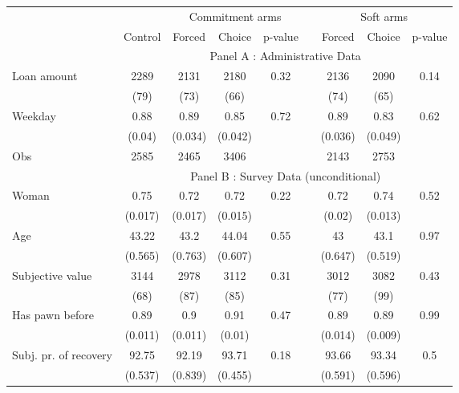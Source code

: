 \begin{tabular}{lcccccccc}
\toprule
      &       & \multicolumn{3}{c}{Commitment arms} &       & \multicolumn{3}{c}{Soft arms} \\
\cmidrule{3-5}\cmidrule{7-9}      & \multicolumn{1}{p{4.545em}}{Control} & \multicolumn{1}{p{4.955em}}{Forced} & \multicolumn{1}{p{3.455em}}{Choice} & \multicolumn{1}{p{3.455em}}{p-value} &       & \multicolumn{1}{p{4.045em}}{Forced} & \multicolumn{1}{p{4.045em}}{Choice } & \multicolumn{1}{p{4.545em}}{p-value} \\
\midrule
      & \multicolumn{8}{c}{Panel A : Administrative Data} \\
\midrule
\midrule
Loan amount  & 2289  & 2131  & 2180  & 0.32  &       & 2136  & 2090  & 0.14 \\
      & (79)  & (73)  & (66)  &       &       & (74)  & (65)  &  \\
Weekday & 0.88  & 0.89  & 0.85  & 0.72  &       & 0.89  & 0.83  & 0.62 \\
      & (0.04) & (0.034) & (0.042) &       &       & (0.036) & (0.049) &  \\
\midrule
Obs   & 2585  & 2465  & 3406  &       &       & 2143  & 2753  &  \\
\midrule
      & \multicolumn{8}{c}{Panel B : Survey Data (unconditional)} \\
\midrule
\midrule
Woman & 0.75  & 0.72  & 0.72  & 0.22  &       & 0.72  & 0.74  & 0.52 \\
      & (0.017) & (0.017) & (0.015) &       &       & (0.02) & (0.013) &  \\
Age   & 43.22 & 43.2  & 44.04 & 0.55  &       & 43    & 43.1  & 0.97 \\
      & (0.565) & (0.763) & (0.607) &       &       & (0.647) & (0.519) &  \\
Subjective value & 3144  & 2978  & 3112  & 0.31  &       & 3012  & 3082  & 0.43 \\
      & (68)  & (87)  & (85)  &       &       & (77)  & (99)  &  \\
Has pawn before & 0.89  & 0.9   & 0.91  & 0.47  &       & 0.89  & 0.89  & 0.99 \\
      & (0.011) & (0.011) & (0.01) &       &       & (0.014) & (0.009) &  \\
Subj. pr. of recovery & 92.75 & 92.19 & 93.71 & 0.18  &       & 93.66 & 93.34 & 0.5 \\
      & (0.537) & (0.839) & (0.455) &       &       & (0.591) & (0.596) &  \\

\end{tabular}
